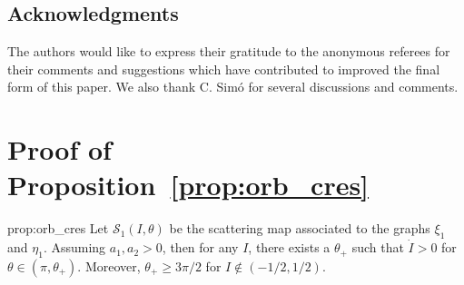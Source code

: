 \documentclass[a4paper,10pt]{article}
\newcommand{\zerom}{\text{1}}
\theoremstyle{definition}
\begin{document}
\subsection*{Acknowledgments}

The authors would like to express their gratitude to the
anonymous referees for their comments and suggestions which
have contributed to improved the final form of this paper.
We also thank C. Sim\'o for several discussions and comments.


\appendix
\section{Proof of Proposition~\ref{prop:orb_cres} \label{app:A}}
\begin{repproposition}{prop:orb_cres}
Let $\mathcal{S}_{ \zerom}(I,\theta)$ be the scattering map associated to the graphs $\xi_{\zerom}$ and $\eta_{\zerom}$.
Assuming $a_1,a_2 >0$, then for any $I$, there exists a $\theta_{+}$ such that $\dot{I}>0$ for $\theta \in (\pi, \theta_{+})$.
Moreover, $\theta_{+}\geq 3\pi/2$ for $I\notin(-1/2 , 1/2)$.  \end{repproposition}
\end{document}
